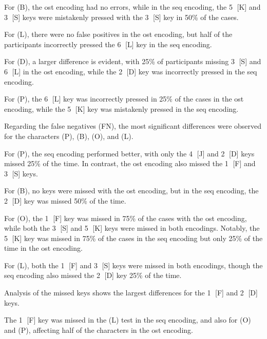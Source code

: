 For (B), the \gls{ost} encoding had no errors, while in the \gls{seq} encoding, the \textcircled{5} [K] and \textcircled{3} [S] keys were mistakenly pressed with the \textcircled{3} [S] key in 50\% of the cases.

For (L), there were no false positives in the \gls{ost} encoding, but half of the participants incorrectly pressed the \textcircled{6} [L] key in the \gls{seq} encoding.

For (D), a larger difference is evident, with 25\% of participants missing \textcircled{3} [S] and \textcircled{6} [L] in the \gls{ost} encoding, while the \textcircled{2} [D] key was incorrectly pressed in the \gls{seq} encoding.

For (P), the \textcircled{6} [L] key was incorrectly pressed in 25\% of the cases in the \gls{ost} encoding, while the \textcircled{5} [K] key was mistakenly pressed in the \gls{seq} encoding.

Regarding the false negatives (FN), the most significant differences were observed for the characters (P), (B), (O), and (L). 

For (P), the \gls{seq} encoding performed better, with only the \textcircled{4} [J] and \textcircled{2} [D] keys missed 25\% of the time. In contrast, the \gls{ost} encoding also missed the \textcircled{1} [F] and \textcircled{3} [S] keys.

For (B), no keys were missed with the \gls{ost} encoding, but in the \gls{seq} encoding, the \textcircled{2} [D] key was missed 50\% of the time.

For (O), the \textcircled{1} [F] key was missed in 75\% of the cases with the \gls{ost} encoding, while both the \textcircled{3} [S] and \textcircled{5} [K] keys were missed in both encodings. Notably, the \textcircled{5} [K] key was missed in 75\% of the cases in the \gls{seq} encoding but only 25\% of the time in the \gls{ost} encoding.

For (L), both the \textcircled{1} [F] and \textcircled{3} [S] keys were missed in both encodings, though the \gls{seq} encoding also missed the \textcircled{2} [D] key 25\% of the time.

Analysis of the missed keys shows the largest differences for the \textcircled{1} [F] and \textcircled{2} [D] keys. 

The \textcircled{1} [F] key was missed in the (L) test in the \gls{seq} encoding, and also for (O) and (P), affecting half of the characters in the \gls{ost} encoding.


